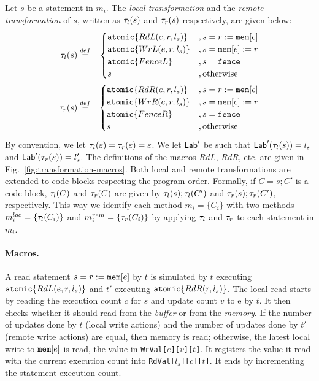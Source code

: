 Let $s$ be a statement in $m_i$.
The {\em local transformation} and the {\em remote transformation} of $s$, written as $\tau_{l}(s)$ and $\tau_{r}(s)$ respectively, are given below:
{\small
\begin{eqnarray*}
 \tau_{l}(s)  & \stackrel{def}{=} &
  \begin{cases}
   \mathtt{atomic}\{RdL(e,r,l_s)\} & , s=r:=\mathtt{mem}[e]\\
   \mathtt{atomic}\{WrL(e,r,l_s)\} & , s=\mathtt{mem}[e]:= r\\
   \mathtt{atomic}\{FenceL\} & , s=\mathtt{fence}\\
   s & , \textnormal{otherwise}
  \end{cases}\\
 \tau_{r}(s) & \stackrel{def}{=} &
  \begin{cases}
   \mathtt{atomic}\{RdR(e,r,l_s)\} & , s=r:=\mathtt{mem}[e]\\
   \mathtt{atomic}\{WrR(e,r,l_s)\} & , s=\mathtt{mem}[e]:= r\\
   \mathtt{atomic}\{FenceR\} & , s=\mathtt{fence}\\
   s & , \textnormal{otherwise}
  \end{cases}
\end{eqnarray*}
}
By convention, we let $\tau_{l}(\varepsilon)=\tau_{r}(\varepsilon)=\varepsilon$.
We let $\mathsf{Lab}'$ be such that $\mathsf{Lab}'(\tau_{l}(s))=l_s$ and $\mathsf{Lab}'(\tau_{r}(s))=l_s'$.
The definitions of the macros $RdL$, $RdR$, etc. are given in Fig.~\ref{fig:transformation-macros}.
Both local and remote transformations are extended to code blocks respecting the program order.
Formally, if $C=s;C'$ is a code block, $\tau_{l}(C)$ and $\tau_{r}(C)$ are given by $\tau_{l}(s); \tau_{l}(C')$ and $\tau_{r}(s); \tau_{r}(C')$, respectively.
This way we identify each method $m_i=\{C_i\}$ with two methods $m^{loc}_i=\{\tau_{l}(C_i)\}$ and $m^{rem}_i=\{\tau_{r}(C_i)\}$ by applying $\tau_{l}$ and $\tau_{r}$ to each statement in $m_i$.


\paragraph{Macros.}
A read statement $s=r:=\mathtt{mem}[e]$ by $t$ is simulated by $t$ executing $\mathtt{atomic}\{RdL(e,r,l_s)\}$ and $t'$ executing $\mathtt{atomic}\{RdR(r,l_s)\}$.
The local read starts by reading the execution count $c$ for $s$ and update count $v$ to {\alimemx e} by $t$.
It then checks whether it should read from the {\em buffer} or from the {\em memory}.
If the number of updates done by $t$ (local write actions) and the number of updates done by $t'$ (remote write actions) are equal, then memory is read; otherwise, the latest local write to $\mathtt{mem}[e]$ is read, the value in {\tt WrVal[$e$][$v$][$t$]}.
It registers the value it read with the current execution count into {\tt RdVal[$l_s$][$c$][$t$]}.
It ends by incrementing the statement execution count.

